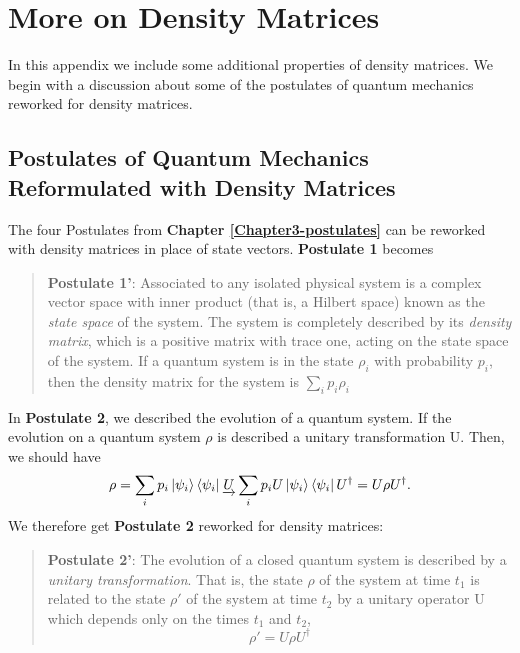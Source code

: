 
\chapter{More on Density Matrices} %

\label{AppendixB} %

In this appendix we include some additional properties of density matrices.  We begin with a discussion about some of the postulates of quantum mechanics reworked for density matrices.

\section{Postulates of Quantum Mechanics Reformulated with Density Matrices}



The four Postulates from \textbf{Chapter \ref{Chapter3-postulates}} can be reworked with density matrices in place of state vectors. \textbf{Postulate 1} becomes
\begin{quote}
\textbf{Postulate 1'}: Associated to any isolated physical system is a complex vector space with inner product (that is, a Hilbert space) known as the \textit{state space} of the system. The system is completely described by its \textit{density matrix}, which is a positive matrix with trace one, acting on the state space of the system. If a quantum system is in the state $\rho_i$ with probability $p_i$, then the density matrix for the system is $\sum_i p_i \rho_i$    
\end{quote}

In \textbf{Postulate 2}, we described the evolution of a quantum system.  If the evolution on a quantum system $\rho$ is described a unitary transformation U. Then, we should have
    \begin{equation}
        \rho=\sum_i p_i \ket{\psi_i}\bra{\psi_i}	\underrightarrow{U}\sum_i p_i U \ket{\psi_i}\bra{\psi_i}U^\dagger=U \rho U^\dagger.
    \end{equation}
We therefore get \textbf{Postulate 2} reworked for density matrices:  
\begin{quote}
    {\bf{Postulate 2'}}: The evolution of a closed quantum system is described by a \textit{unitary transformation}. That is, the state $\rho$ of the system at time $t_1$ is related to the state $\rho'$ of the system at time $t_2$ by a unitary operator U which depends only on the times $t_1$ and $t_2$,
    \begin{equation} \label{eqn: density matrix postulate 2}
    \rho'=U\rho U^\dagger        
    \end{equation}
\end{quote}

